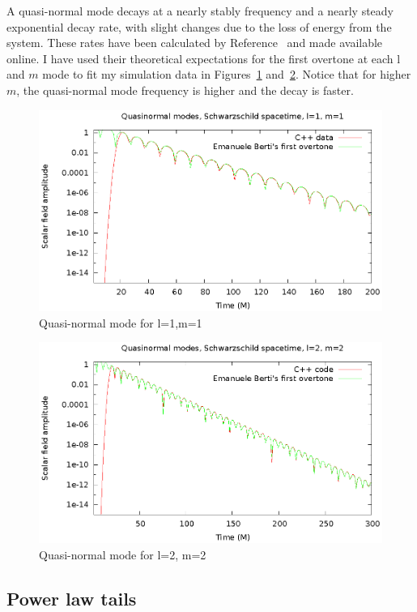 A quasi-normal mode decays at a nearly stably frequency and a nearly steady exponential decay rate, with slight changes due to the loss of energy from the system. These rates have been calculated by Reference~\cite{bertiSchwQNM} and made available online. I have used their theoretical expectations for the first overtone at each l and $m$ mode to fit my simulation data in Figures~\ref{qnml1m1} and~\ref{qnml2m2}. Notice that for higher $m$, the quasi-normal mode frequency is higher and the decay is faster.

\begin{figure}
  \includegraphics{l1m1qnm}
  \caption{Quasi-normal mode for l=1,m=1}
  \label{qnml1m1}
\end{figure}

\begin{figure}
  \includegraphics{l2m2qnm}
  \caption{Quasi-normal mode for l=2, m=2}
  \label{qnml2m2}
\end{figure}


\subsection{Power law tails}

